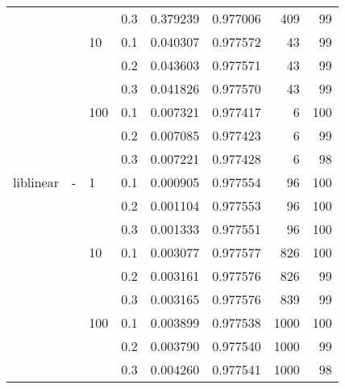 \begin{table}[H]
\begin{tabular}{llllrrrr}
          &   &     & 0.3 &  0.379239 &  0.977006 &     409 &    99 \\
          &   & 10  & 0.1 &  0.040307 &  0.977572 &      43 &    99 \\
          &   &     & 0.2 &  0.043603 &  0.977571 &      43 &    99 \\
          &   &     & 0.3 &  0.041826 &  0.977570 &      43 &    99 \\
          &   & 100 & 0.1 &  0.007321 &  0.977417 &       6 &   100 \\
          &   &     & 0.2 &  0.007085 &  0.977423 &       6 &    99 \\
          &   &     & 0.3 &  0.007221 &  0.977428 &       6 &    98 \\
liblinear & - & 1   & 0.1 &  0.000905 &  0.977554 &      96 &   100 \\
          &   &     & 0.2 &  0.001104 &  0.977553 &      96 &   100 \\
          &   &     & 0.3 &  0.001333 &  0.977551 &      96 &   100 \\
          &   & 10  & 0.1 &  0.003077 &  0.977577 &     826 &   100 \\
          &   &     & 0.2 &  0.003161 &  0.977576 &     826 &    99 \\
          &   &     & 0.3 &  0.003165 &  0.977576 &     839 &    99 \\
          &   & 100 & 0.1 &  0.003899 &  0.977538 &    1000 &   100 \\
          &   &     & 0.2 &  0.003790 &  0.977540 &    1000 &    99 \\
          &   &     & 0.3 &  0.004260 &  0.977541 &    1000 &    98 \\
\bottomrule
\end{tabular}
\end{table}
